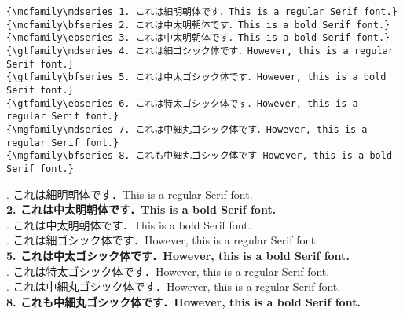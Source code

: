 \begin{tcolorbox}[title=\gtbf{宣言型和文コマンド入力},colback=blue!5!white,colframe=blue!70!black,enhanced,breakable=true]
\begin{lstlisting}
{\mcfamily\mdseries 1. これは細明朝体です．This is a regular Serif font.}
{\mcfamily\bfseries 2. これは中太明朝体です．This is a bold Serif font.}
{\mcfamily\ebseries 3. これは中太明朝体です．This is a bold Serif font.}
{\gtfamily\mdseries 4. これは細ゴシック体です．However, this is a regular Serif font.}
{\gtfamily\bfseries 5. これは中太ゴシック体です．However, this is a bold Serif font.}
{\gtfamily\ebseries 6. これは特太ゴシック体です．However, this is a regular Serif font.}
{\mgfamily\mdseries 7. これは中細丸ゴシック体です．However, this is a regular Serif font.}
{\mgfamily\bfseries 8. これも中細丸ゴシック体です However, this is a bold Serif font.}
\end{lstlisting}
\begin{tcolorbox}[title=\gtbf{出力},colback=yellow!15!white,colframe=blue!75!black]
{\mcfamily{}. これは細明朝体です．This is a regular Serif font.}\\
{\mcfamily\bfseries 2. これは中太明朝体です．This is a bold Serif font.}\\
{\mcfamily{}. これは中太明朝体です．This is a bold Serif font.}\\
{\gtfamily{}. これは細ゴシック体です．However, this is a regular {\color{red}Serif} font.}\\
{\gtfamily\bfseries 5. これは中太ゴシック体です．However, this is a bold {\color{red}Serif} font.}\\
{\gtfamily{}. これは特太ゴシック体です．However, this is a regular {\color{red}Serif} font.}\\
{\mgfamily{}. これは中細丸ゴシック体です．However, this is a regular {\color{red}Serif} font.}\\
{\mgfamily\bfseries 8. これも{\color{red}中細}丸ゴシック体です．However, this is a bold {\color{red}Serif} font.}
\end{tcolorbox}
\end{tcolorbox}

